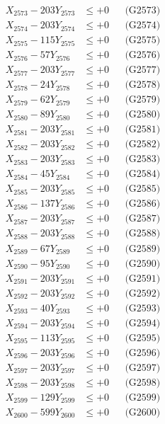 \documentclass[a4paper,10pt]{article}
\begin{document}
{\begin{align}
X_{2573} - 203Y_{2573} &\leq +0 && \text{(G2573)} \\
X_{2574} - 203Y_{2574} &\leq +0 && \text{(G2574)} \\
X_{2575} - 115Y_{2575} &\leq +0 && \text{(G2575)} \\
X_{2576} - 57Y_{2576} &\leq +0 && \text{(G2576)} \\
X_{2577} - 203Y_{2577} &\leq +0 && \text{(G2577)} \\
X_{2578} - 24Y_{2578} &\leq +0 && \text{(G2578)} \\
X_{2579} - 62Y_{2579} &\leq +0 && \text{(G2579)} \\
X_{2580} - 89Y_{2580} &\leq +0 && \text{(G2580)} \\
\allowbreak
X_{2581} - 203Y_{2581} &\leq +0 && \text{(G2581)} \\
X_{2582} - 203Y_{2582} &\leq +0 && \text{(G2582)} \\
X_{2583} - 203Y_{2583} &\leq +0 && \text{(G2583)} \\
X_{2584} - 45Y_{2584} &\leq +0 && \text{(G2584)} \\
X_{2585} - 203Y_{2585} &\leq +0 && \text{(G2585)} \\
X_{2586} - 137Y_{2586} &\leq +0 && \text{(G2586)} \\
X_{2587} - 203Y_{2587} &\leq +0 && \text{(G2587)} \\
X_{2588} - 203Y_{2588} &\leq +0 && \text{(G2588)} \\
X_{2589} - 67Y_{2589} &\leq +0 && \text{(G2589)} \\
X_{2590} - 95Y_{2590} &\leq +0 && \text{(G2590)} \\
\allowbreak
X_{2591} - 203Y_{2591} &\leq +0 && \text{(G2591)} \\
X_{2592} - 203Y_{2592} &\leq +0 && \text{(G2592)} \\
X_{2593} - 40Y_{2593} &\leq +0 && \text{(G2593)} \\
X_{2594} - 203Y_{2594} &\leq +0 && \text{(G2594)} \\
X_{2595} - 113Y_{2595} &\leq +0 && \text{(G2595)} \\
X_{2596} - 203Y_{2596} &\leq +0 && \text{(G2596)} \\
X_{2597} - 203Y_{2597} &\leq +0 && \text{(G2597)} \\
X_{2598} - 203Y_{2598} &\leq +0 && \text{(G2598)} \\
X_{2599} - 129Y_{2599} &\leq +0 && \text{(G2599)} \\
X_{2600} - 599Y_{2600} &\leq +0 && \text{(G2600)} \\

\end{align}}
\end{document}
